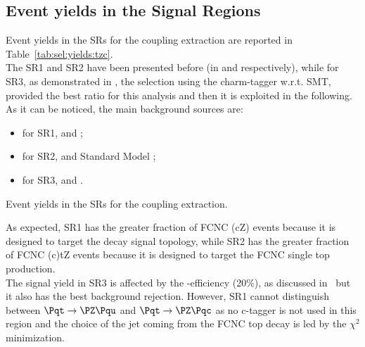 \subsection{Event yields in the Signal Regions}
Event yields in the SRs for the \tZc coupling extraction are reported in Table~\ref{tab:sel:yields:tzc}.\\
The SR1 and SR2 have been presented before (in  and  respectively),
while for SR3, as demonstrated in , the selection using the charm-tagger \DLrc
w.r.t. SMT, provided the best \ssplusb ratio for this analysis and then it is exploited in the following.\\
As it can be noticed, the main background sources are:
\begin{itemize}
	\item for SR1\tZc, \ttZ and \VVHF;
	\item for SR2\tZc, \VVHF and Standard Model \tZq ;
	\item for SR3\tZc, \ttZ and \VVHF .
\end{itemize}

\begin{table}[!htbp]
	\centering
	\small
	
	\caption{Event yields in the SRs for the \tZc coupling extraction. \TabErrStatOnly} 
	\label{tab:sel:yields:tzc}
\end{table} 
\noindent As expected, SR1 has the greater fraction of FCNC \ttbar(cZ) events because it is designed to target the decay signal topology, while SR2 has the greater fraction of FCNC (c)tZ events because it is designed to target the FCNC single top production.\\
The signal yield in SR3 is affected by the \DLrc  \Pqc-efficiency (20\%), as discussed in~ but it also has the best background rejection. However, SR1 cannot distinguish between $\mathrm{\Pqt\rightarrow\PZ\Pqu}$ and $\mathrm{\Pqt\rightarrow\PZ\Pqc}$ as no c-tagger is not used in this region and the choice of the jet coming from the FCNC top decay is led by the $\chi^2$ minimization.

\clearpage
